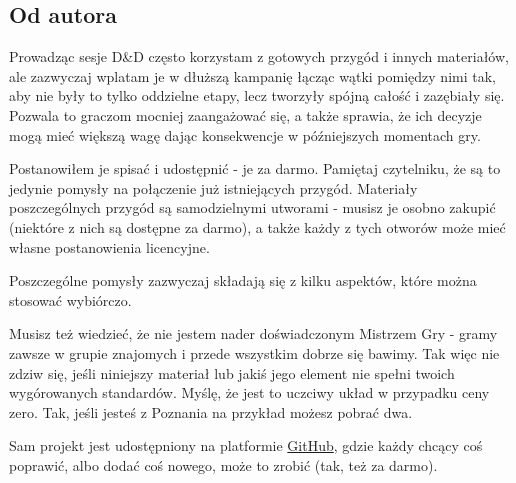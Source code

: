 \documentclass[letterpaper,twoside,twocolumn,openany,nodeprecatedcode]{dndbook}
\begin{document}
\tableofcontents

\mainmatter%


\clearpage

\begin{onecolumn}
\section{Od autora}
Prowadząc sesje D\&D często korzystam z gotowych przygód i innych materiałów, ale zazwyczaj wplatam je w dłuższą
kampanię łącząc wątki pomiędzy nimi tak, aby nie były to tylko oddzielne etapy, lecz tworzyły spójną całość i zazębiały
się. Pozwala to graczom mocniej zaangażować się, a także sprawia, że ich decyzje mogą mieć większą wagę dając
konsekwencje w późniejszych momentach gry.
\par
Postanowiłem je spisać i udostępnić - je za darmo. Pamiętaj czytelniku, że są to jedynie pomysły na połączenie już
istniejących przygód. Materiały poszczególnych przygód są samodzielnymi utworami - musisz je osobno zakupić (niektóre z
nich są dostępne za darmo), a także każdy z tych otworów może mieć własne postanowienia licencyjne.
\par
Poszczególne pomysły zazwyczaj składają się z kilku aspektów, które można stosować wybiórczo.
\par
Musisz też wiedzieć, że nie jestem nader doświadczonym Mistrzem Gry - gramy zawsze w grupie znajomych i przede wszystkim
dobrze się bawimy. Tak więc nie zdziw się, jeśli niniejszy materiał lub jakiś jego element nie spełni twoich
wygórowanych standardów. Myślę, że jest to uczciwy układ w przypadku ceny zero. Tak, jeśli jesteś z Poznania na przykład
możesz pobrać dwa.
\par
Sam projekt jest udostępniony na platformie \href{https://github.com/rafalwrzeszcz/dnd-mashups}{GitHub}, gdzie każdy
chcący coś poprawić, albo dodać coś nowego, może to zrobić (tak, też za darmo).
\end{onecolumn}






\end{document}
